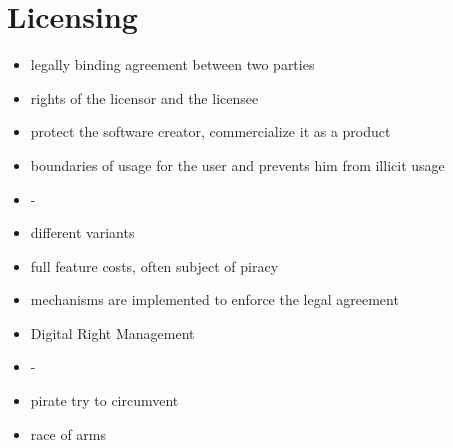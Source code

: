 \section{Licensing} \label{subsection:introduction-licensing}
\begin{itemize}
    \item legally binding agreement between two parties
    \item rights of the licensor and the licensee
    \item protect the software creator, commercialize it as a product
    \item boundaries of usage for the user and prevents him from illicit usage
    \item -
    \item different variants
    \item full feature costs, often subject of piracy
    \item mechanisms are implemented to enforce the legal agreement
    \item Digital Right Management
    \item -
    \item pirate try to circumvent
    \item race of arms
\end{itemize}
